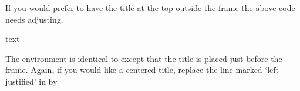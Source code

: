     If you would prefer to have the title at the top outside the frame the 
above code needs adjusting.
\begin{comment}
\begin{lcode}
\newcommand{\TitleFrame}[2]{%
  \fboxrule=\FrameRule \fboxsep=\FrameSep
  \vbox{\nobreak \vskip -0.7\FrameSep
    \rlap{\strut#1}\nobreak\nointerlineskip%
    \vskip 0.7\FrameSep
    \noindent\fbox{#2}}}
\newenvironment{titledframe}[2][\FrameFirst@Lab\ (cont.)]{%
  \def\FrameFirst@Lab{\textbf{#2}}%
  \def\FrameCont@Lab{\textbf{#1}}%
  \def\FrameCommand##1{%
    \TitleFrame{\FrameCurrent@Lab}{##1}
    \global\let\FrameCurrent@Lab\FrameNext@Lab
    \global\let\FrameNext@Lab\FrameCont@Lab
  }%
  \global\let\FrameCurrent@Lab\FrameFirst@Lab
  \global\let\FrameNext@Lab\FrameFirst@Lab
  \MakeFramed{\hsize\textwidth
              \advance\hsize -2\FrameRule
              \advance\hsize -2\FrameSep
              \FrameRestore}}%
  {\endMakeFramed}
\end{lcode}
\end{comment}

\begin{lcode}
\newcommand{\TitleFrame}[2]{%
  \fboxrule=\FrameRule \fboxsep=\FrameSep
  \vbox{\nobreak \vskip -0.7\FrameSep
    \rlap{\strut#1}\nobreak\nointerlineskip%
    \vskip 0.7\FrameSep
    \noindent\fbox{#2}}}
\newenvironment{titledframe}[2][\FrameFirst@Lab\ (cont.)]{%
  \def\FrameFirst@Lab{\textbf{#2}}%
  \def\FrameCont@Lab{\textbf{#1}}%
  \def\FrameCommand##1{%
    \TitleFrame{\FrameFirst@Lab}{##1}}
  \def\FirstFrameCommand##1{%
    \TitleFrame{\FrameFirst@Lab}{##1}}
  \def\MidFrameCommand##1{%
    \TitleFrame{\FrameCont@Lab}{##1}}
  \def\LastFrameCommand##1{%
    \TitleFrame{\FrameCont@Lab}{##1}}
  \MakeFramed{\hsize\textwidth
              \advance\hsize -2\FrameRule
              \advance\hsize -2\FrameSep
              \FrameRestore}}%
  {\endMakeFramed}
\end{lcode}

\begin{syntax}
 text  \\
\end{syntax}
The  environment is identical to 
except that the title is placed just before the frame. Again, if
you would like a centered title, replace the line marked `left justified'
in \cmd{\TitleFrame} by
\begin{lcode}
\nobreak\nointerlineskip%
\end{lcode}

